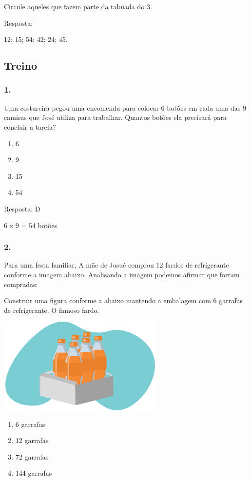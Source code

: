 Circule aqueles que fazem parte da tabuada do 3.

Resposta:

12; 15; 54; 42; 24; 45.

\subsection{Treino}\label{treino-1}

\subsubsection{1.}\label{section-30}

Uma costureira pegou uma encomenda para colocar 6 botões em cada uma das
9 camisas que José utiliza para trabalhar. Quantos botões ela precisará
para concluir a tarefa?

\begin{enumerate}
\def\labelenumi{\alph{enumi})}
\item
  6
\item
  9
\item
  15
\item
  54
\end{enumerate}

Resposta: D

6 x 9 = 54 botões

\subsubsection{2. }\label{section-31}

Para uma festa familiar, A mãe de Josué comprou 12 fardos de
refrigerante conforme a imagem abaixo. Analisando a imagem podemos
afirmar que forram compradas:

Construir uma figura conforme a abaixo mantendo a embalagem com 6
garrafas de refrigerante. O famoso fardo.

\includegraphics[width=3.25862in,height=1.89183in]{media/image26.png}

\begin{enumerate}
\def\labelenumi{\alph{enumi})}
\item
  6 garrafas
\item
  12 garrafas
\item
  72 garrafas
\item
  144 garrafas
\end{enumerate}

